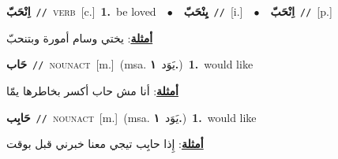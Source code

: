 \documentclass[10pt,a4paper,twoside]{article} %
\begin{document}
\begin{multicols}{2}
{\setlength\topsep{0pt}\textbf{\foreignlanguage{arabic}{اِنْحَبّ}}\ {\color{gray}\texttt{//}\color{black}}\ \textsc{verb}\ [c.]\ \textbf{1.}~be loved\ \ $\bullet$\ \ \setlength\topsep{0pt}\textbf{\foreignlanguage{arabic}{يِنْحَبّ}}\ {\color{gray}\texttt{//}\color{black}}\ [i.]\ \ $\bullet$\ \ \setlength\topsep{0pt}\textbf{\foreignlanguage{arabic}{اِنْحَبّ}}\ {\color{gray}\texttt{//}\color{black}}\ [p.]\  \begin{flushright}\color{gray}\foreignlanguage{arabic}{\textbf{\underline{\foreignlanguage{arabic}{أمثلة}}}: يختي وسام أمورة وبتنحبّ}\end{flushright}\color{black}} \vspace{2mm}

{\setlength\topsep{0pt}\textbf{\foreignlanguage{arabic}{حَاب}}\ {\color{gray}\texttt{//}\color{black}}\ \textsc{noun\textunderscore act}\ [m.]\ \color{gray}(msa. \foreignlanguage{arabic}{يَوَد}~\foreignlanguage{arabic}{\textbf{١.}})\color{black}\ \textbf{1.}~would like\  \begin{flushright}\color{gray}\foreignlanguage{arabic}{\textbf{\underline{\foreignlanguage{arabic}{أمثلة}}}: أنا مش حاب أكسر بخاطرها يمّا}\end{flushright}\color{black}} \vspace{2mm}

{\setlength\topsep{0pt}\textbf{\foreignlanguage{arabic}{حَابِب}}\ {\color{gray}\texttt{//}\color{black}}\ \textsc{noun\textunderscore act}\ [m.]\ \color{gray}(msa. \foreignlanguage{arabic}{يَوَد}~\foreignlanguage{arabic}{\textbf{١.}})\color{black}\ \textbf{1.}~would like\  \begin{flushright}\color{gray}\foreignlanguage{arabic}{\textbf{\underline{\foreignlanguage{arabic}{أمثلة}}}: إِذا حابِب تيجي معنا خبرني قبل بوقت}\end{flushright}\color{black}} \vspace{2mm}


\end{multicols}
\end{document}
